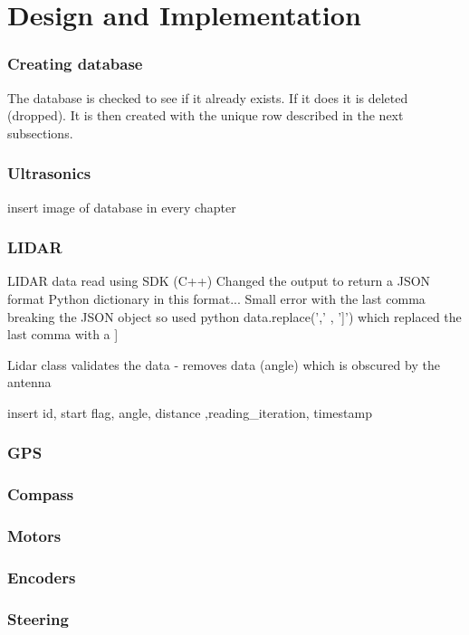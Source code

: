 \section{Design and Implementation}

\subsubsection{Creating database}
The database is checked to see if it already exists. If it does it is deleted (dropped). It is then created with the unique row described in the next subsections.

\subsubsection{Ultrasonics}
insert image of database in every chapter


\subsubsection{LIDAR}
\gls{LIDAR} data read using SDK (C++)
Changed the output to return a JSON format
Python dictionary in this format...
Small error with the last comma breaking the JSON object so used python data.replace(',\n' , ']') which replaced the last comma with a ]

Lidar class validates the data
 - removes data (angle) which is obscured by the antenna

 insert id, start flag, angle, distance ,reading_iteration, timestamp

\subsubsection{GPS}

\subsubsection{Compass}

\subsubsection{Motors}

\subsubsection{Encoders}

\subsubsection{Steering}
